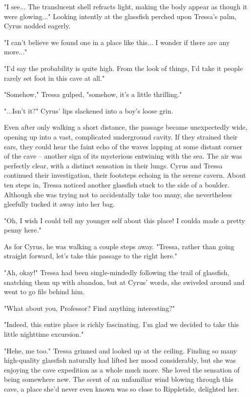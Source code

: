"I see... The translucent shell refracts light, making the body appear as though it were glowing..." Looking intently at the glassfish perched upon Tressa's palm, Cyrus nodded eagerly.

"I can't believe we found one in a place like this... I wonder if there are any more..."

"I'd say the probability is quite high. From the look of things, I'd take it people rarely set foot in this cave at all."

"Somehow," Tressa gulped, "somehow, it's a little thrilling."

"...Isn't it?" Cyrus' lips slackened into a boy's loose grin.
\newline

Even after only walking a short distance, the passage became unexpectedly wide, opening up into a vast, complicated underground cavity. If they strained their ears, they could hear the faint echo of the waves lapping at some distant corner of the cave -- another sign of its mysterious entwining with the sea. The air was perfectly clear, with a distinct sensation in their lungs. Cyrus and Tressa continued their investigation, their footsteps echoing in the serene cavern. About ten steps in, Tressa noticed another glassfish stuck to the side of a boulder. Although she was trying not to accidentally take too many, she nevertheless gleefully tucked it away into her bag. 

"Oh, I wish I could tell my younger self about this place! I coulda made a pretty penny here." 

As for Cyrus, he was walking a couple steps away. "Tressa, rather than going straight forward, let's take this passage to the right here."

"Ah, okay!" Tressa had been single-mindedly following the trail of glassfish, snatching them up with abandon, but at Cyrus' words, she swiveled around and went to go file behind him.

"What about you, Professor? Find anything interesting?"

"Indeed, this entire place is richly fascinating. I'm glad we decided to take this little nighttime excursion."

"Hehe, me too." Tressa grinned and looked up at the ceiling. Finding so many high-quality glassfish naturally had lifted her mood considerably, but she was enjoying the cave expedition as a whole much more. She loved the sensation of being somewhere new. The scent of an unfamiliar wind blowing through this cave, a place she'd never even known was so close to Rippletide, delighted her. 

